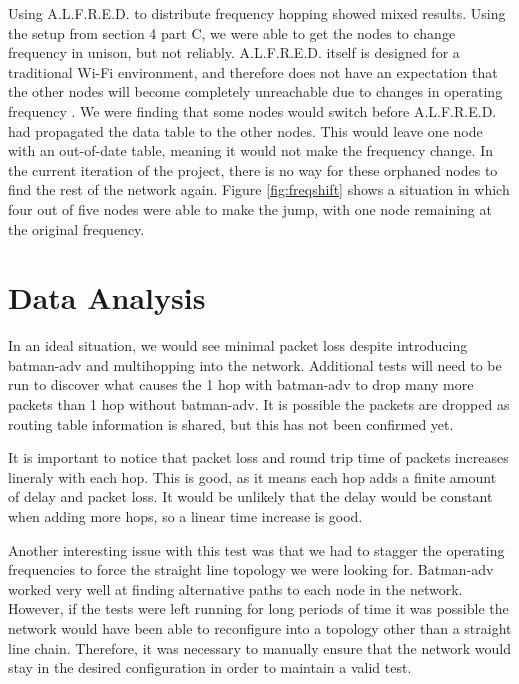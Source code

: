 Using A.L.F.R.E.D. to distribute frequency hopping showed mixed results. Using the setup from section 4 part C, we were able to get the nodes to change frequency in unison, but not reliably. A.L.F.R.E.D. itself is designed for a traditional Wi-Fi environment, and therefore does not have an expectation that the other nodes will become completely unreachable due to changes in operating frequency \cite{0015}. We were finding that some nodes would switch before A.L.F.R.E.D. had propagated the data table to the other nodes. This would leave one node with an out-of-date table, meaning it would not make the frequency change. In the current iteration of the project, there is no way for these orphaned nodes to find the rest of the network again. Figure \ref{fig:freqshift} shows a situation in which four out of five nodes were able to make the jump, with one node remaining at the original frequency.



\section{Data Analysis}

In an ideal situation, we would see minimal packet loss despite introducing batman-adv and multihopping into the network. Additional tests will need to be run to discover what causes the 1 hop with batman-adv to drop many more packets than 1 hop without batman-adv. It is possible the packets are dropped as routing table information is shared, but this has not been confirmed yet. 

It is important to notice that packet loss and round trip time of packets increases lineraly with each hop. This is good, as it means each hop adds a finite amount of delay and packet loss. It would be unlikely that the delay would be constant when adding more hops, so a linear time increase is good. 

Another interesting issue with this test was that we had to stagger the operating frequencies to force the straight line topology we were looking for. Batman-adv worked very well at finding alternative paths to each node in the network. However, if the tests were left running for long periods of time it was possible the network would have been able to reconfigure into a topology other than a straight line chain. Therefore, it was necessary to manually ensure that the network would stay in the desired configuration in order to maintain a valid test. 

